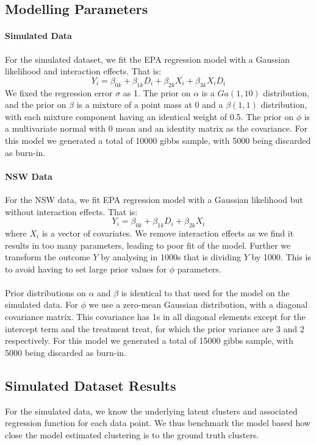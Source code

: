 \documentclass{article}
\begin{document}
\subsection{Modelling Parameters}
\paragraph{Simulated Data}
For the simulated dataset, we fit the EPA regression model with a Gaussian likelihood and interaction effects. That is:
$$Y_i = \beta_{0k} + \beta_{1k}D_i + \beta_{2k}X_i + \beta_{3k}X_iD_i$$ We fixed the regression error $\sigma$ as 1. The prior on $\alpha$ is a $Ga(1,10)$ distribution, and the prior on $\beta$ is a mixture of a point mass at 0 and a $\beta(1,1)$ distribution, with each mixture component having an identical weight of 0.5. The prior on $\phi$ is a multivariate normal with 0 mean and an identity matrix as the covariance.  For this model we generated a total of 10000 gibbs sample, with 5000 being discarded as burn-in. 

\paragraph{NSW Data} For the NSW data, we fit EPA regression model with a Gaussian likelihood but without interaction effects. That is:
$$Y_i = \beta_{0k} + \beta_{1k}D_i + \beta_{2k}X_i$$ where $X_i$ is a vector of covariates. We remove interaction effects as we find it results in too many parameters, leading to poor fit of the model. Further we transform the outcome $Y$ by analysing in 1000s that is dividing $Y$ by 1000. This is to avoid having to set large prior values for $\phi$ parameters.
\\ \\
Prior distributions on $\alpha$ and $\beta$ is identical to that used for the model on the simulated data. For $\phi$ we use a zero-mean Gaussian distribution, with a diagonal covariance matrix. This covariance has 1s in all diagonal elements except for the intercept term and the treatment treat, for which the prior variance are 3 and 2 respectively. For this model we generated a total of 15000 gibbs sample, with 5000 being discarded as burn-in. 

\subsection{Simulated Dataset Results} 
For the simulated data, we know the underlying latent clusters and associated regression function for each data point. We thus benchmark the model based how close the model estimated clustering is to the ground truth clusters. 
\end{document}
